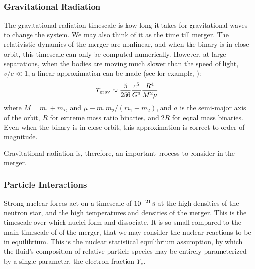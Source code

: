 \subsubsection{Gravitational Radiation}
The gravitational radiation timescale is how long it takes for gravitational
waves to change the system. We may also think of it as the time till merger.
The relativistic dynamics of the merger
are nonlinear, and when the binary is in close orbit, this timescale can only
be computed numerically. However, at large separations, when the bodies are
moving much slower than the speed of light, $v/c\ll1$, a linear approximation
can be made (see for example, \citealt[Sec.~16.4]{shap1983-bh_wd_ns}):
\begin{equation}
  T_{\rm grav} \approx \frac{5}{256}\frac{c^5}{G^3}\frac{R^4}{M^2\mu},
\end{equation}
where $M=m_1+m_2$, and $\mu \equiv m_1 m_2/(m_1+m_2)$, and $a$ is the semi-major
axis of the orbit, $R$ for extreme mass ratio binaries, and $2R$ for equal mass
binaries.
Even when the binary is in close orbit, this approximation is correct to order
of magnitude.

Gravitational radiation is, therefore, an important process to consider in the
merger.

\subsubsection{Particle Interactions}
Strong nuclear forces act on a timescale of $10^{-21}\,{\rm s}$ at the high
densities of the neutron star, and the high temperatures and densities of the
merger. This is the timescale over which
nuclei form and dissociate. It is so small compared to the main timescale of
of the merger, that we may consider the nuclear reactions to be in equilibrium.
This is the nuclear statistical equilibrium assumption, by which the fluid's
composition of relative particle species may be entirely parameterized by a
single parameter, the electron fraction $Y_e$.

